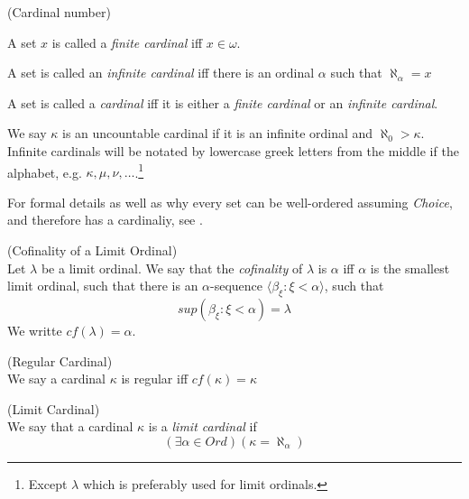 \begin{definition}{(Cardinal number)}\label{def:cardinal}\\
\bce[(i)]
\item A set $x$ is called a \emph{finite cardinal} iff $x \in \omega$.
\item A set is called an \emph{infinite cardinal} iff there is an ordinal $\alpha$ such that $\aleph_\alpha = x$
\item A set is called a \emph{cardinal} iff it is either a \emph{finite cardinal} or an \emph{infinite cardinal}.
\ece
\end{definition}
We say $\kappa$ is an uncountable cardinal if it is an infinite ordinal and $\aleph_0 > \kappa$.
Infinite cardinals will be notated by lowercase greek letters from the middle if the alphabet, e.g. $\kappa, \mu, \nu, \ldots$.\footnote{Except $\lambda$ which is preferably used for limit ordinals.}

For formal details as well as why every set can be well-ordered assuming \emph{Choice}, and therefore has a cardinaliy, see \cite{JechBook}. %

\begin{definition}{(Cofinality of a Limit Ordinal)}\label{def:cofinality}\\ %
Let $\lambda$ be a limit ordinal. We say that the \emph{cofinality} of $\lambda$ is $\alpha$ iff $\alpha$ is the smallest limit ordinal, such that there is an $\alpha$-sequence $\langle \beta_\xi : \xi < \alpha \rangle$, such that  %
\begin{equation}
sup(\beta_\xi: \xi < \alpha) = \lambda
\end{equation}
We writte $cf(\lambda) = \alpha$.
\end{definition}

\begin{definition}{(Regular Cardinal)}\label{def:regular_cardinal}\\
We say a cardinal $\kappa$ is regular iff $cf(\kappa) = \kappa$
\end{definition}

\begin{definition}{(Limit Cardinal)}\label{def:limit_cardinal}\\
We say that a cardinal $\kappa$ is a \emph{limit cardinal} if
\begin{equation}
(\exists \alpha \in Ord)(\kappa = \aleph_\alpha) %
\end{equation}
\end{definition}

